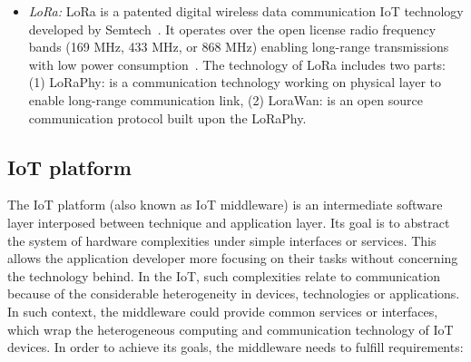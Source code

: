 \begin{description}
\begin{itemize}
    \item \textit{LoRa: } LoRa is a patented digital wireless data communication IoT technology developed by Semtech~\cite{LoRaGate79:online}. It operates over the open license radio frequency bands (169 MHz, 433 MHz, or 868 MHz) enabling long-range transmissions with low power consumption~\cite{LoRaWANR96:online}. The technology of LoRa includes two parts: (1) LoRaPhy: is a communication technology working on physical layer to enable long-range communication link, (2) LoraWan: is an open source communication protocol built upon the LoRaPhy. 
    
    \end{itemize}
    
\end{description}

\subsection{IoT platform}

The IoT platform (also known as IoT middleware) is an intermediate software layer interposed between technique and application layer. Its goal is to abstract the system of hardware complexities under simple interfaces or services. This allows the application developer more focusing on their tasks without concerning the technology behind. In the IoT, such complexities relate to communication because of the considerable heterogeneity in devices, technologies or applications. In such context, the middleware could provide common services or interfaces, which wrap the heterogeneous computing and communication technology of IoT devices. In order to achieve its goals, the middleware needs to fulfill requirements:


